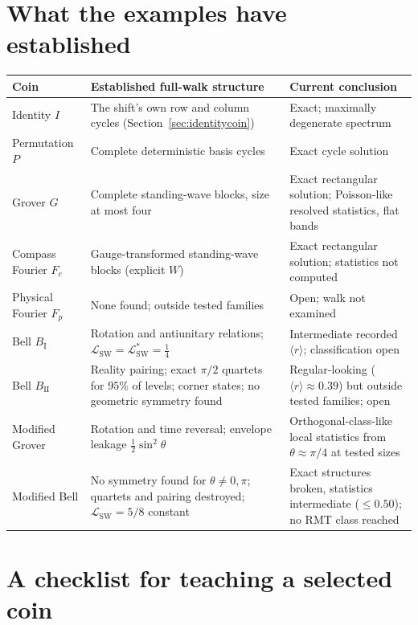 \documentclass[11pt,a4paper,oneside]{report}
\newcommand{\Id}{I}
\newcommand{\sw}{\mathrm{SW}}
\numberwithin{equation}{chapter}
\begin{document}
\section{What the examples have established}

\begin{center}
\small
\begin{tabularx}{\textwidth}{@{}lYY@{}}
\toprule
Coin&Established full-walk structure&Current conclusion\\
\midrule
Identity \(\Id\)&The shift's own row and column cycles (Section~\ref{sec:identitycoin})&Exact; maximally degenerate spectrum\\
Permutation \(P\)&Complete deterministic basis cycles&Exact cycle solution\\
Grover \(G\)&Complete standing-wave blocks, size at most four&Exact rectangular solution; Poisson-like resolved statistics, flat bands\\
Compass Fourier \(F_c\)&Gauge-transformed standing-wave blocks (explicit \(W\))&Exact rectangular solution; statistics not computed\\
Physical Fourier \(F_p\)&None found; outside tested families&Open; walk not examined\\
Bell \(B_{\mathrm I}\)&Rotation and antiunitary relations; \(\mathcal L_{\sw}=\mathcal L^*_{\sw}=\tfrac14\)&Intermediate recorded \(\langle r\rangle\); classification open\\
Bell \(B_{\mathrm{II}}\)&Reality pairing; exact \(\pi/2\) quartets for \(95\%\) of levels; corner states; no geometric symmetry found&Regular-looking (\(\langle r\rangle\approx0.39\)) but outside tested families; open\\
Modified Grover&Rotation and time reversal; envelope leakage \(\tfrac12\sin^2\theta\)&Orthogonal-class-like local statistics from \(\theta\approx\pi/4\) at tested sizes\\
Modified Bell&No symmetry found for \(\theta\neq0,\pi\); quartets and pairing destroyed; \(\mathcal L_{\sw}=5/8\) constant&Exact structures broken, statistics intermediate (\(\le0.50\)); no RMT class reached\\
\bottomrule
\end{tabularx}
\end{center}

\section{A checklist for teaching a selected coin}
\end{document}
